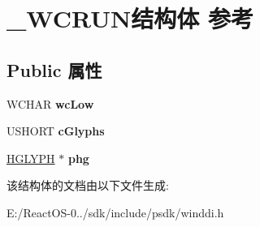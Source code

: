\hypertarget{struct___w_c_r_u_n}{}\section{\+\_\+\+W\+C\+R\+U\+N结构体 参考}
\label{struct___w_c_r_u_n}
\subsection*{Public 属性}
\begin{DoxyCompactItemize}
\item 
\mbox{\label{struct___w_c_r_u_n_a90120e7bc8c961f7c43161918afc2222}} 
W\+C\+H\+AR {\bfseries wc\+Low}
\item 
\mbox{\label{struct___w_c_r_u_n_ad17266d5ce85967848634d2170fb15e4}} 
U\+S\+H\+O\+RT {\bfseries c\+Glyphs}
\item 
\mbox{\label{struct___w_c_r_u_n_a5d2f7bcb2b4e42bc5485a27cf2c3b18c}} 
\hyperlink{interfacevoid}{H\+G\+L\+Y\+PH} $\ast$ {\bfseries phg}
\end{DoxyCompactItemize}


该结构体的文档由以下文件生成\+:\begin{DoxyCompactItemize}
\item 
E\+:/\+React\+O\+S-\/0../sdk/include/psdk/winddi.\+h\end{DoxyCompactItemize}
